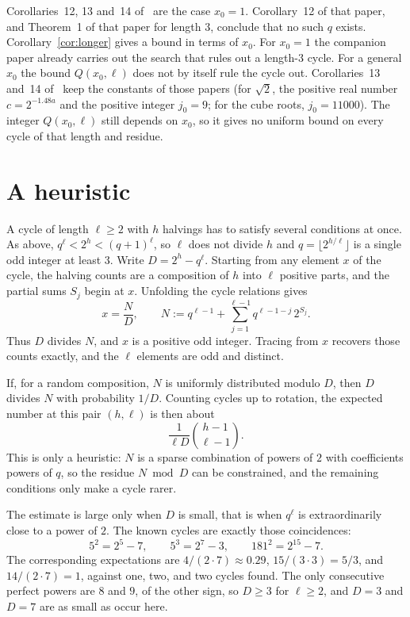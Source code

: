 \documentclass[11pt]{article}
\begin{document}
Corollaries~12, 13 and~14 of~\cite{hackman-i} are the case $x_0 = 1$.
Corollary~12 of that paper, and Theorem~1 of that paper for length $3$, conclude that no such $q$ exists.
Corollary~\ref{cor:longer} gives a bound in terms of $x_0$.
For $x_0 = 1$ the companion paper already carries out the search that rules out a length-$3$ cycle.
For a general $x_0$ the bound $Q(x_0, \ell)$ does not by itself rule the cycle out.
Corollaries~13 and~14 of~\cite{hackman-i} keep the constants of those papers (for $\sqrt{2}$, the positive real number $c = 2^{-1.48 a}$ and the positive integer $j_0 = 9$; for the cube roots, $j_0 = 11000$).
The integer $Q(x_0, \ell)$ still depends on $x_0$, so it gives no uniform bound on every cycle of that length and residue.

\section{A heuristic}
\label{sec:all-cycles}

A cycle of length $\ell \ge 2$ with $h$ halvings has to satisfy several conditions at once.
As above, $q^\ell < 2^h < (q+1)^\ell$, so $\ell$ does not divide $h$ and $q = \lfloor 2^{h/\ell}\rfloor$ is a single odd integer at least $3$.
Write $D = 2^h - q^\ell$.
Starting from any element $x$ of the cycle, the halving counts are a composition of $h$ into $\ell$ positive parts, and the partial sums $S_j$ begin at $x$.
Unfolding the cycle relations gives
\[
x = \frac{N}{D}, \qquad N := q^{\ell-1} + \sum_{j=1}^{\ell-1} q^{\ell-1-j}\, 2^{S_j}.
\]
Thus $D$ divides $N$, and $x$ is a positive odd integer.
Tracing from $x$ recovers those counts exactly, and the $\ell$ elements are odd and distinct.

If, for a random composition, $N$ is uniformly distributed modulo $D$, then $D$ divides $N$ with probability $1/D$.
Counting cycles up to rotation, the expected number at this pair $(h,\ell)$ is then about
\[
\frac{1}{\ell D}\binom{h-1}{\ell-1}.
\]
This is only a heuristic: $N$ is a sparse combination of powers of $2$ with coefficients powers of $q$, so the residue $N \bmod D$ can be constrained, and the remaining conditions only make a cycle rarer.

The estimate is large only when $D$ is small, that is when $q^\ell$ is extraordinarily close to a power of $2$.
The known cycles are exactly those coincidences:
\[
5^2 = 2^5 - 7, \qquad 5^3 = 2^7 - 3, \qquad 181^2 = 2^{15} - 7.
\]
The corresponding expectations are $4/(2\cdot 7) \approx 0.29$, $15/(3\cdot 3) = 5/3$, and $14/(2\cdot 7) = 1$, against one, two, and two cycles found.
The only consecutive perfect powers are $8$ and $9$, of the other sign, so $D \ge 3$ for $\ell \ge 2$, and $D = 3$ and $D = 7$ are as small as occur here.
\end{document}
